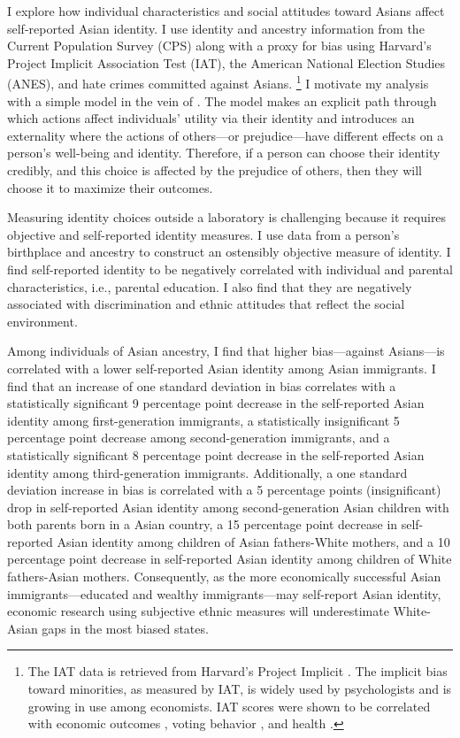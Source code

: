 I explore how individual characteristics and social attitudes toward Asians affect self-reported Asian identity. I use identity and ancestry information from the Current Population Survey (CPS) along with a proxy for bias using Harvard's Project Implicit Association Test (IAT), the American National Election Studies (ANES), and hate crimes committed against Asians. \footnote{The IAT data is retrieved from Harvard's Project Implicit \autocite{greenwaldMeasuringIndividualDifferences1998}. The implicit bias toward minorities, as measured by IAT, is widely used by psychologists and is growing in use among economists. IAT scores were shown to be correlated with economic outcomes \autocite{chettyRaceEconomicOpportunity2020,gloverDiscriminationSelfFulfillingProphecy2017}, voting behavior \autocite{friesePredictingVotingBehavior2007}, and health \autocite{leitnerRacialBiasAssociated2016}.} I motivate my analysis with a simple model in the vein of \textcite{akerlofEconomicsIdentity2000}. The model makes an explicit path through which actions affect individuals' utility via their identity and introduces an externality where the actions of others---or prejudice---have different effects on a person's well-being and identity. Therefore, if a person can choose their identity credibly, and this choice is affected by the prejudice of others, then they will choose it to maximize their outcomes.

Measuring identity choices outside a laboratory is challenging because it requires objective and self-reported identity measures. I use data from a person's birthplace and ancestry to construct an ostensibly objective measure of identity. I find self-reported identity to be negatively correlated with individual and parental characteristics, i.e., parental education. I also find that they are negatively associated with discrimination and ethnic attitudes that reflect the social environment. 

Among individuals of Asian ancestry, I find that higher bias---against Asians---is correlated with a lower self-reported Asian identity among Asian immigrants. I find that an increase of one standard deviation in bias correlates with a statistically significant 9 percentage point decrease in the self-reported Asian identity among first-generation immigrants, a statistically insignificant 5 percentage point decrease among second-generation immigrants, and a statistically significant 8 percentage point decrease in the self-reported Asian identity among third-generation immigrants. Additionally, a one standard deviation increase in bias is correlated with a 5 percentage points (insignificant) drop in self-reported Asian identity among second-generation Asian children with both parents born in a Asian country, a 15 percentage point decrease in self-reported Asian identity among children of Asian fathers-White mothers, and a 10 percentage point decrease in self-reported Asian identity among children of White fathers-Asian mothers. Consequently, as the more economically successful Asian immigrants---educated and wealthy immigrants---may self-report Asian identity, economic research using subjective ethnic measures will underestimate White-Asian gaps in the most biased states. 

